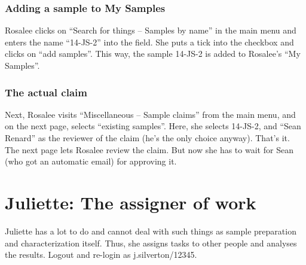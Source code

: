 \documentclass[a4paper,11pt,english]{sphinxmanual}
\begin{document}
\subsubsection{Adding a sample to My Samples}
\label{demo:adding-a-sample-to-my-samples}
Rosalee clicks on “Search for things – Samples by name” in the main menu and
enters the name “14-JS-2” into the field.  She puts a tick into the checkbox
and clicks on “add samples”.  This way, the sample 14-JS-2 is added to
Rosalee's “My Samples”.


\subsubsection{The actual claim}
\label{demo:the-actual-claim}
{\hfill{}}

Next, Rosalee visits “Miscellaneous – Sample claims” from the main menu, and on
the next page, selects “existing samples”.  Here, she selects 14-JS-2, and
“Sean Renard” as the reviewer of the claim (he's the only choice anyway).
That's it.  The next page lets Rosalee review the claim.  But now she has to
wait for Sean (who got an automatic email) for approving it.


\section{Juliette: The assigner of work}
\label{demo:juliette-the-assigner-of-work}
Juliette has a lot to do and cannot deal with such things as sample preparation
and characterization itself.  Thus, she assigns tasks to other people and
analyses the results.  Logout and re-login as j.silverton/12345.
\end{document}
